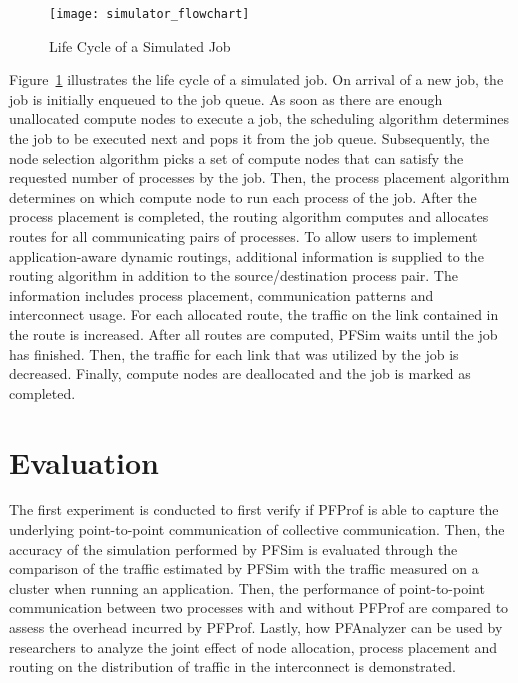 \begin{figure}
    \centering
    \texttt{[image: simulator\_flowchart]}
    \caption{Life Cycle of a Simulated Job}%
    \label{fig:simulator-flowchart}
\end{figure}

Figure~\ref{fig:simulator-flowchart} illustrates the life cycle of a
simulated job. On arrival of a new job, the job is initially enqueued to
the job queue. As soon as there are enough unallocated compute nodes
to execute a job, the scheduling algorithm determines the job to be
executed next and pops it from the job queue. Subsequently, the node
selection algorithm picks a set of compute nodes that can satisfy the
requested number of processes by the job. Then, the process placement
algorithm determines on which compute node to run each process of the
job. After the process placement is completed, the routing algorithm
computes and allocates routes for all communicating pairs of processes.
To allow users to implement application-aware dynamic routings,
additional information is supplied to the routing algorithm in addition
to the source/destination process pair. The information includes process
placement, communication patterns and interconnect usage. For each
allocated route, the traffic on the link contained in the route is
increased. After all routes are computed, PFSim waits until the job has
finished. Then, the traffic for each link that was utilized by the job
is decreased. Finally, compute nodes are deallocated and the job is
marked as completed.

\section{Evaluation}\label{sec:ii-evaluation}

The first experiment is conducted to first verify if PFProf is able to capture
the underlying point-to-point communication of collective communication. Then,
the accuracy of the simulation performed by PFSim is evaluated through the
comparison of the traffic estimated by PFSim with the traffic measured on a
cluster when running an application. Then, the performance of point-to-point
communication between two processes with and without PFProf are compared to
assess the overhead incurred by PFProf. Lastly, how PFAnalyzer can be
used by researchers to analyze the joint effect of node allocation, process
placement and routing on the distribution of traffic in the interconnect is
demonstrated.

